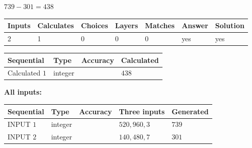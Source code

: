 \documentclass{ctexart}
\begin{document}
 

$ %
739 -  %
301=   %
438$
 
 
\noindent{}
 
 

 
   
   
   
   
\noindent\begin{tabular}{|l|l|l|l|l|l|l|}
 \hline
Inputs & Calculates & Choices & Layers & Matches & Answer & Solution \\ \hline
 2  & 
 1  & 
 0
  & 
 0  & 
 0  & 
  yes & 
  yes 
  \\ \hline
 \end{tabular}
   
   
   
   
\noindent{}
   
   
  
  
\noindent\begin{tabular}{|l|l|l|l|}
\hline
 Sequential & Type & Accuracy & Calculated \\ 
\hline
 
 
  Calculated $  1 $ & integer &  & 
  $ 438 $ 
 \\  \hline  
 \end{tabular}
   
   
   
   
\noindent\vspace{0.1in}\hspace{-0.08in} {\textbf{\Large{All inputs: }}}
   
   
  
  
\noindent\begin{tabular}{|l|l|l|l|l|}
\hline
 Sequential & Type & Accuracy & Three inputs & Generated \\ 
\hline
 
 
  INPUT $  1 $ & integer &  & $
 520
 , 
 960
 , 
 3
 $ & $ 739 $ 
 \\  \hline  
 
 
  INPUT $  2 $ & integer &  & $
 140
 , 
 480
 , 
 7
 $ & $ 301 $ 
 \\  \hline  
 \end{tabular}
   
   
   
   
   
   
 \vspace{0.2in}
 
\end{document}
